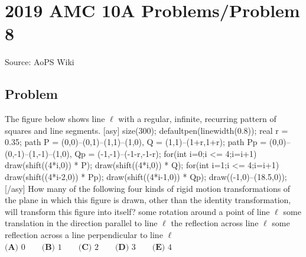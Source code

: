 \documentclass[12pt]{article}
\begin{document}
\section*{{2019 AMC 10A Problems/Problem 8}}
Source: AoPS Wiki

\subsection*{Problem}
The figure below shows line $\ell$ with a regular, infinite, recurring pattern of squares and line segments. [asy] size(300); defaultpen(linewidth(0.8)); real r = 0.35; path P = (0,0)--(0,1)--(1,1)--(1,0), Q = (1,1)--(1+r,1+r); path Pp = (0,0)--(0,-1)--(1,-1)--(1,0), Qp = (-1,-1)--(-1-r,-1-r); for(int i=0;i <= 4;i=i+1) { draw(shift((4*i,0)) * P); draw(shift((4*i,0)) * Q); } for(int i=1;i <= 4;i=i+1) { draw(shift((4*i-2,0)) * Pp); draw(shift((4*i-1,0)) * Qp); } draw((-1,0)--(18.5,0)); [/asy] How many of the following four kinds of rigid motion transformations of the plane in which this figure is drawn, other than the identity transformation, will transform this figure into itself? some rotation around a point of line $\ell$ some translation in the direction parallel to line $\ell$ the reflection across line $\ell$ some reflection across a line perpendicular to line $\ell$ $\textbf{(A) } 0 \qquad\textbf{(B) } 1 \qquad\textbf{(C) } 2 \qquad\textbf{(D) } 3 \qquad\textbf{(E) } 4$
\end{document}
